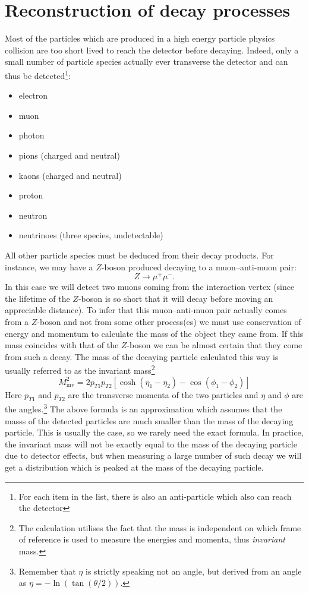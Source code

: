 \section{Reconstruction of decay processes}
Most of the particles which are produced in a high energy particle physics collision are too short lived to reach the detector before decaying. Indeed, only a small number of particle species actually ever transverse the detector and can thus be detected\footnote{For each item in the list, there is also an anti-particle which also can reach the detector}:
\begin{itemize}
	\item
		electron
	\item
		muon
	\item
		photon
	\item
		pions (charged and neutral)
	\item
		kaons (charged and neutral)
	\item
		proton
	\item
		neutron
	\item
		neutrinoes (three species, undetectable)
\end{itemize}
All other particle species must be deduced from their decay products. For instance, we may have a $Z$-boson produced decaying to a muon--anti-muon pair:
\begin{displaymath}
	Z \to \mu^+\mu^-.
\end{displaymath}
In this case we will detect two muons coming from the interaction vertex (since the lifetime of the $Z$-boson is so short that it will decay before moving an appreciable distance). To infer that this muon--anti-muon pair actually comes from a $Z$-boson and not from some other process(es) we must use conservation of energy and momentum to calculate the mass of the object they came from. If this mass coincides with that of the $Z$-boson we can be almost certain that they come from such a decay. The mass of the decaying particle calculated this way is usually referred to as the invariant mass\footnote{The calculation utilises the fact that the mass is independent on which frame of reference is used to measure the energies and momenta, thus \emph{invariant} mass.}
\begin{displaymath}
	M_\text{inv}^2 = 2p_{T1}p_{T2}\left[\cosh(\eta_1-\eta_2)-\cos(\phi_1-\phi_2)\right]
\end{displaymath}
Here $p_{T1}$ and $p_{T2}$ are the transverse momenta of the two particles and $\eta$ and $\phi$ are the angles.\footnote{Remember that $\eta$ is strictly speaking not an angle, but derived from an angle as $\eta=-\ln(\tan(\theta/2))$.} The above formula is an approximation which assumes that the masss of the detected particles are much smaller than the mass of the decaying particle. This is usually the case, so we rarely need the exact formula. In practice, the invariant mass will not be exactly equal to the mass of the decaying particle due to detector effects, but when measuring a large number of such decay we will get a distribution which is peaked at the mass of the decaying particle.

